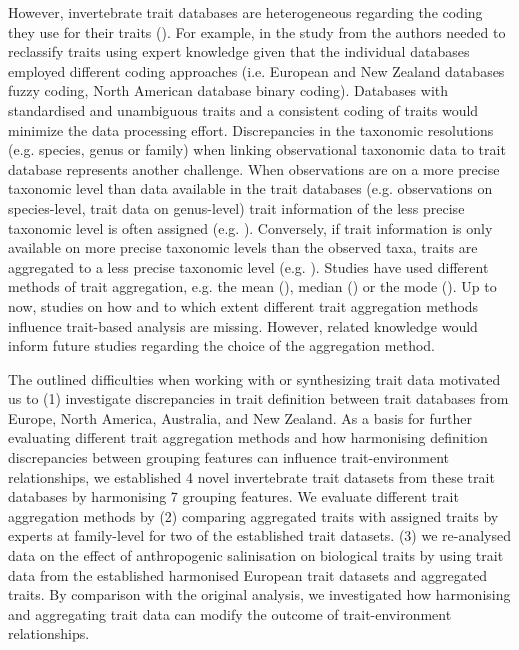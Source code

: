 \documentclass{article}
\begin{document}
However, invertebrate trait databases are heterogeneous regarding the coding they use for their traits (\cite{culp_incorporating_2011}). For example, in the study from \citet{brown_functional_2018} the authors needed to reclassify traits using expert knowledge given that the individual databases employed different coding approaches (i.e. European and New Zealand databases fuzzy coding, North American database binary coding). Databases with standardised and unambiguous traits and a consistent coding of traits would minimize the data processing effort. Discrepancies in the taxonomic resolutions (e.g. species, genus or family) when linking observational taxonomic data to trait database represents another challenge. When observations are on a more precise taxonomic level than data available in the trait databases (e.g. observations on species-level, trait data on genus-level) trait information of the less precise taxonomic level is often assigned (e.g. \cite{szocs_effects_2014, vos_taxonomic_2017}). Conversely, if trait information is only available on more precise taxonomic levels than the observed taxa, traits are aggregated to a less precise taxonomic level (e.g. \cite{poff_functional_2006, szocs_effects_2014, piliere_a._f._h._importance_2016, aspin_extreme_2019}). Studies have used different methods of trait aggregation, e.g. the mean (\cite{magliozzi_functional_2019}), median (\cite{szocs_effects_2014}) or the mode (\cite{piliere_a._f._h._importance_2016}). Up to now, studies on how and to which extent different trait aggregation methods influence trait-based analysis are missing. However, related knowledge would inform future studies regarding the choice of the aggregation method.

The outlined difficulties when working with or synthesizing trait data motivated us to (1) investigate discrepancies in trait definition between trait databases from Europe, North America, Australia, and New Zealand. As a basis for further evaluating different trait aggregation methods and how harmonising definition discrepancies between grouping features can influence trait-environment relationships, we established 4 novel invertebrate trait datasets from these trait databases by harmonising 7 grouping features. We evaluate different trait aggregation methods by (2) comparing aggregated traits with assigned traits by experts at family-level for two of the established trait datasets. (3) we re-analysed data on the effect of anthropogenic salinisation on biological traits by \citet{szocs_effects_2014} using trait data from the established harmonised European trait datasets and aggregated traits. By comparison with the original analysis, we investigated how harmonising and aggregating trait data can modify the outcome of trait-environment relationships.
\end{document}

